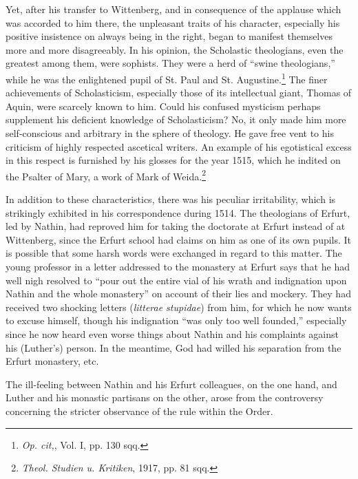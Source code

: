 Yet, after his transfer to Wittenberg, and in consequence of the
applause which was accorded to him there, the unpleasant traits of
his character, especially his positive insistence on always being in the
right, began to manifest themselves more and more disagreeably.
In his opinion, the Scholastic theologians, even the greatest among
them, were sophists. They were a herd of “swine theologians,” while
he was the enlightened pupil of St. Paul and St. Augustine.\footnote{\textit{Op. cit,}, Vol. I, pp. 130 sqq.}
The finer achievements of Scholasticism, especially those of its intellectual
giant, Thomas of Aquin, were scarcely known to him. Could
his confused mysticism perhaps supplement his deficient knowledge
of Scholasticism? No, it only made him more self-conscious and
arbitrary in the sphere of theology. He gave free vent to his criticism
of highly respected ascetical writers. An example of his egotistical
excess in this respect is furnished by his glosses for the year 1515,
which he indited on the Psalter of Mary, a work of Mark of
Weida.\footnote{\textit{Theol. Studien u. Kritiken}, 1917, pp. 81 sqq.}

In addition to these characteristics, there was his peculiar
irritability, which is strikingly exhibited in his correspondence during
1514. The theologians of Erfurt, led by Nathin, had reproved him for
taking the doctorate at Erfurt instead of at Wittenberg, since the
Erfurt school had claims on him as one of its own pupils. It is possible
that some harsh words were exchanged in regard to this matter. The
young professor in a letter addressed to the monastery at Erfurt says
that he had well nigh resolved to “pour out the entire vial of his
wrath and indignation upon Nathin and the whole monastery”
on account of their lies and mockery. They had received two shocking
letters (\textit{litterae stupidae}) from him, for which he now wants to
excuse himself, though his indignation “was only too well founded,”
especially since he now heard even worse things about Nathin and
his complaints against his (Luther’s) person. In the meantime, God
had willed his separation from the Erfurt monastery, etc.

The ill-feeling between Nathin and his Erfurt colleagues, on the
one hand, and Luther and his monastic partisans on the other, arose
from the controversy concerning the stricter observance of the rule
within the Order.
